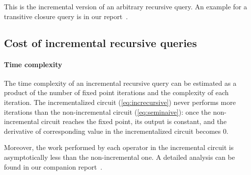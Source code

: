 This is the incremental version of an arbitrary recursive query.  An
example for a transitive closure query is in our report~\cite{tr}.


\subsection{Cost of incremental recursive queries}

\paragraph{Time complexity}

The time complexity of an incremental recursive query can be estimated as a product of
the number of fixed point iterations and the complexity of each iteration. The
incrementalized circuit (\ref{eq:increcursive}) never performs more
iterations than the non-incremental circuit (\ref{eq:seminaive}):
once the non-incremental circuit reaches the fixed point, its output is constant,
and the derivative of corresponding value in the incrementalized circuit becomes 0.

Moreover, the work performed by each operator in the incremental
circuit is asymptotically less than the non-incremental one.  A
detailed analysis can be found in our companion report~\cite{tr}.


